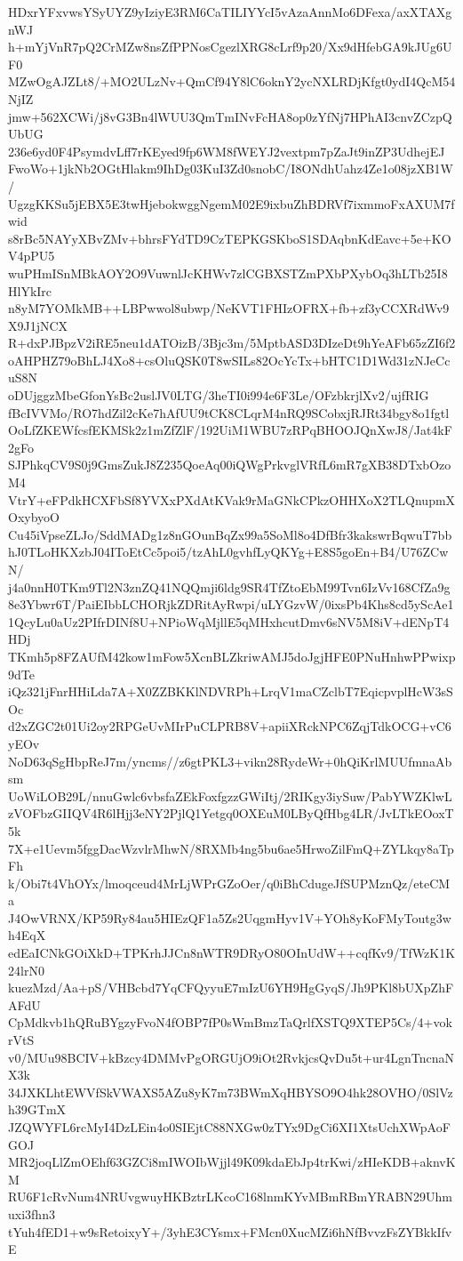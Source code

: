 HDxrYFxvwsYSyUYZ9yIziyE3RM6CaTILIYYcI5vAzaAnnMo6DFexa/axXTAXgnWJ
h+mYjVnR7pQ2CrMZw8nsZfPPNosCgezlXRG8cLrf9p20/Xx9dHfebGA9kJUg6UF0
MZwOgAJZLt8/+MO2ULzNv+QmCf94Y8lC6oknY2ycNXLRDjKfgt0ydI4QcM54NjIZ
jmw+562XCWi/j8vG3Bn4lWUU3QmTmINvFcHA8op0zYfNj7HPhAI3cnvZCzpQUbUG
236e6yd0F4PsymdvLff7rKEyed9fp6WM8fWEYJ2vextpm7pZaJt9inZP3UdhejEJ
FwoWo+1jkNb2OGtHlakm9IhDg03KuI3Zd0snobC/I8ONdhUahz4Ze1o08jzXB1W/
UgzgKKSu5jEBX5E3twHjebokwggNgemM02E9ixbuZhBDRVf7ixmmoFxAXUM7fwid
s8rBc5NAYyXBvZMv+bhrsFYdTD9CzTEPKGSKboS1SDAqbnKdEavc+5e+KOV4pPU5
wuPHmISnMBkAOY2O9VuwnlJcKHWv7zlCGBXSTZmPXbPXybOq3hLTb25I8HlYkIrc
n8yM7YOMkMB++LBPwwol8ubwp/NeKVT1FHIzOFRX+fb+zf3yCCXRdWv9X9J1jNCX
R+dxPJBpzV2iRE5neu1dATOizB/3Bjc3m/5MptbASD3DIzeDt9hYeAFb65zZI6f2
oAHPHZ79oBhLJ4Xo8+csOluQSK0T8wSILs82OcYcTx+bHTC1D1Wd31zNJeCcuS8N
oDUjggzMbeGfonYsBc2uslJV0LTG/3heTI0i994e6F3Le/OFzbkrjlXv2/ujfRIG
fBcIVVMo/RO7hdZil2cKe7hAfUU9tCK8CLqrM4nRQ9SCobxjRJRt34bgy8o1fgtl
OoLfZKEWfcsfEKMSk2z1mZfZlF/192UiM1WBU7zRPqBHOOJQnXwJ8/Jat4kF2gFo
SJPhkqCV9S0j9GmsZukJ8Z235QoeAq00iQWgPrkvglVRfL6mR7gXB38DTxbOzoM4
VtrY+eFPdkHCXFbSf8YVXxPXdAtKVak9rMaGNkCPkzOHHXoX2TLQnupmXOxybyoO
Cu45iVpseZLJo/SddMADg1z8nGOunBqZx99a5SoMl8o4DfBfr3kakswrBqwuT7bb
hJ0TLoHKXzbJ04IToEtCc5poi5/tzAhL0gvhfLyQKYg+E8S5goEn+B4/U76ZCwN/
j4a0nnH0TKm9Tl2N3znZQ41NQQmji6ldg9SR4TfZtoEbM99Tvn6IzVv168CfZa9g
8e3Ybwr6T/PaiEIbbLCHORjkZDRitAyRwpi/uLYGzvW/0ixsPb4Khs8cd5yScAe1
1QcyLu0aUz2PIfrDINf8U+NPioWqMjllE5qMHxhcutDmv6sNV5M8iV+dENpT4HDj
TKmh5p8FZAUfM42kow1mFow5XcnBLZkriwAMJ5doJgjHFE0PNuHnhwPPwixp9dTe
iQz321jFnrHHiLda7A+X0ZZBKKlNDVRPh+LrqV1maCZclbT7EqicpvplHcW3sSOc
d2xZGC2t01Ui2oy2RPGeUvMIrPuCLPRB8V+apiiXRckNPC6ZqjTdkOCG+vC6yEOv
NoD63qSgHbpReJ7m/yncms//z6gtPKL3+vikn28RydeWr+0hQiKrlMUUfmnaAbsm
UoWiLOB29L/nnuGwlc6vbsfaZEkFoxfgzzGWiItj/2RIKgy3iySuw/PabYWZKlwL
zVOFbzGIIQV4R6lHjj3eNY2PjlQ1Yetgq0OXEuM0LByQfHbg4LR/JvLTkEOoxT5k
7X+e1Uevm5fggDacWzvlrMhwN/8RXMb4ng5bu6ae5HrwoZilFmQ+ZYLkqy8aTpFh
k/Obi7t4VhOYx/lmoqceud4MrLjWPrGZoOer/q0iBhCdugeJfSUPMznQz/eteCMa
J4OwVRNX/KP59Ry84au5HIEzQF1a5Zs2UqgmHyv1V+YOh8yKoFMyToutg3wh4EqX
edEaICNkGOiXkD+TPKrhJJCn8nWTR9DRyO80OInUdW++cqfKv9/TfWzK1K24lrN0
kuezMzd/Aa+pS/VHBcbd7YqCFQyyuE7mIzU6YH9HgGyqS/Jh9PKl8bUXpZhFAFdU
CpMdkvb1hQRuBYgzyFvoN4fOBP7fP0sWmBmzTaQrlfXSTQ9XTEP5Cs/4+vokrVtS
v0/MUu98BCIV+kBzcy4DMMvPgORGUjO9iOt2RvkjcsQvDu5t+ur4LgnTncnaNX3k
34JXKLhtEWVfSkVWAXS5AZu8yK7m73BWmXqHBYSO9O4hk28OVHO/0SlVzh39GTmX
JZQWYFL6rcMyI4DzLEin4o0SIEjtC88NXGw0zTYx9DgCi6XI1XtsUchXWpAoFGOJ
MR2joqLlZmOEhf63GZCi8mIWOIbWjjl49K09kdaEbJp4trKwi/zHIeKDB+aknvKM
RU6F1cRvNum4NRUvgwuyHKBztrLKcoC168lnmKYvMBmRBmYRABN29Uhmuxi3fhn3
tYuh4fED1+w9sRetoixyY+/3yhE3CYsmx+FMcn0XucMZi6hNfBvvzFsZYBkkIfvE
